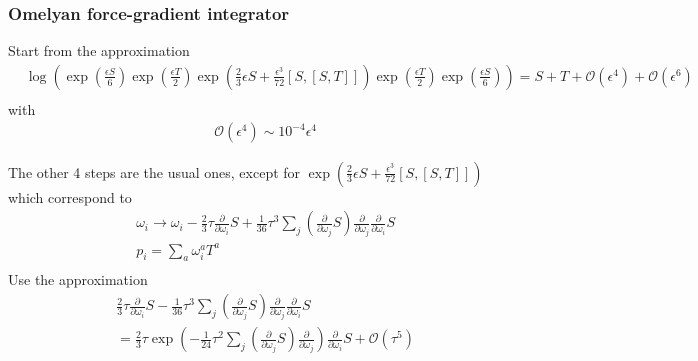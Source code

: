 \subsubsection{\label{sec:OmelyanForceGradient}Omelyan force-gradient integrator}

Start from the approximation
\begin{equation}
\begin{split}
&\log\left(\exp(\frac{\epsilon S}{6})\exp(\frac{\epsilon T}{2})\exp\left(\frac{2}{3}\epsilon S+\frac{\epsilon^3}{72}[S,[S,T]]\right)\exp(\frac{\epsilon T}{2})\exp(\frac{\epsilon S}{6})\right)=S+T+\mathcal{O}(\epsilon ^4)+\mathcal{O}(\epsilon ^6)\\
\end{split}
\end{equation}
with~\cite{forcegradient1}
\begin{equation}
\begin{split}
&\mathcal{O}(\epsilon^4)\sim 10^{-4}\epsilon^4
\end{split}
\end{equation}

The other 4 steps are the usual ones, except for $\exp\left(\frac{2}{3}\epsilon S+\frac{\epsilon^3}{72}[S,[S,T]]\right)$ which correspond to
\begin{equation}
\begin{split}
&\omega_i\to \omega_i-\frac{2}{3}\tau \frac{\partial }{\partial \omega _i}S+\frac{1}{36}\tau ^3 \sum _j \left(\frac{\partial }{\partial \omega _j}S\right)\frac{\partial }{\partial \omega _j}\frac{\partial }{\partial \omega _i}S\\
&p_i=\sum _a \omega ^a_iT^a\\
\end{split}
\end{equation}
Use the approximation~\cite{forcegradient2}
\begin{equation}
\begin{split}
&\frac{2}{3}\tau \frac{\partial }{\partial \omega _i}S-\frac{1}{36}\tau ^3 \sum _j \left(\frac{\partial }{\partial \omega _j}S\right)\frac{\partial }{\partial \omega _j}\frac{\partial }{\partial \omega _i}S\\
&=\frac{2}{3}\tau \exp\left(-\frac{1}{24}\tau ^2 \sum _j\left(\frac{\partial}{\partial \omega _j}S\right)\frac{\partial}{\partial \omega _j}\right)\frac{\partial}{\partial \omega_i}S+\mathcal{O}(\tau ^5)\\
\end{split}
\end{equation}

